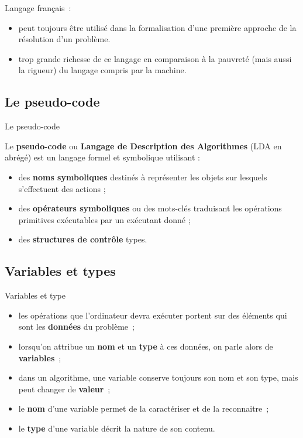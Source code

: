 \begin{frame}{Langage}
	français~: 
	\begin{itemize}
	\item 
		peut toujours être
		utilisé dans la formalisation d’une première 
		approche de la résolution
		d’un problème.
	
	\item
		trop grande richesse de ce langage en
		comparaison à la pauvreté (mais aussi la rigueur) 
		du langage compris par la machine.
	
	\end{itemize}
\end{frame}

\subsection{Le pseudo-code}

\begin{frame}{Le pseudo-code}
	
	\bigskip
	Le \textbf{pseudo-code} ou \textbf{Langage de Description des
	Algorithmes} (LDA en abrégé) est un langage formel et symbolique
	utilisant :

	\begin{itemize}
	\item
		des \textbf{noms symboliques} destinés à représenter les objets sur
		lesquels s’effectuent des actions ;
	\item
		des \textbf{opérateurs symboliques} ou des mots-clés traduisant les
		opérations primitives exécutables par un exécutant donné ;
	\item
		des \textbf{structures de contrôle} types.
	\end{itemize}
\end{frame}

\subsection{Variables et types}

\begin{frame}{Variables et type}
	\begin{itemize}
		\item les opérations que l’ordinateur devra exécuter portent
			sur des éléments qui sont les \textbf{données} du problème~;
		\item lorsqu’on attribue un \textbf{nom} et un \textbf{type} 
			à ces données, on parle	alors de \textbf{variables}~;
		\item dans un algorithme, une variable conserve
			toujours son nom et son type, mais peut changer de \textbf{valeur}~;
		\item le \textbf{nom} d’une variable permet de la caractériser et de la
			reconnaitre~;
		\item le \textbf{type} d’une variable décrit la nature de son contenu.
	\end{itemize}
\end{frame}

